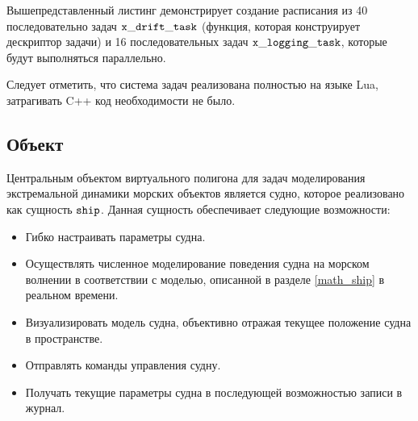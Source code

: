 Вышепредставленный листинг демонстрирует создание расписания из 40 последовательно задач $\tt x\_drift\_task$ (функция, которая конструирует дескриптор задачи) и 16 последовательных задач 
$\tt x\_logging\_task$, которые будут выполняться параллельно.

Следует отметить, что система задач реализована полностью на языке Lua, затрагивать C++ код необходимости не было.

%

\subsection{Объект }

Центральным объектом виртуального полигона для задач моделирования экстремальной динамики морских объектов является судно, которое реализовано как сущность $\tt ship$. 
Данная сущность обеспечивает следующие возможности:
\begin{itemize}
	\item	Гибко настраивать параметры судна.
	\item	Осуществлять численное моделирование поведения судна на морском волнении 
			в соответствии с моделью, описанной в разделе \ref{math_ship} в реальном времени.
	\item 	Визуализировать модель судна, объективно отражая текущее положение судна в пространстве.
	\item	Отправлять команды управления судну.
	\item	Получать текущие параметры судна в последующей возможностью записи в журнал.
\end{itemize}


